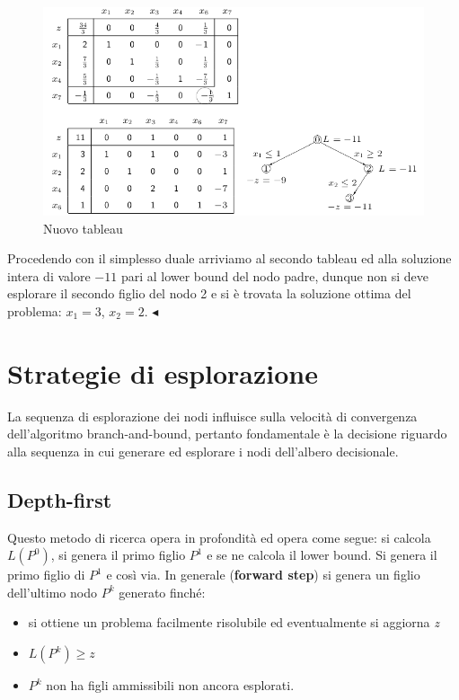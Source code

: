 \documentclass[11pt]{book}
\begin{document}
\begin{figure}[h!]
  \centering
  \includegraphics[width=\textwidth]{images/cap6tab15.png}
  \caption{Nuovo tableau}
  \label{cap6tab15}
\end{figure}

Procedendo con il simplesso duale arriviamo al secondo tableau ed alla
soluzione intera di valore $-11$ pari al lower bound del nodo padre,
dunque non si deve esplorare il secondo figlio del nodo 2 e si \`e
trovata la soluzione ottima del problema: $x_1 = 3$, $x_2 =
2$. $\blacktriangleleft$
\vspace{11pt}

\section{Strategie di esplorazione}

La sequenza di esplorazione dei nodi influisce sulla velocit\`a di
convergenza dell'algoritmo branch-and-bound, pertanto fondamentale \`e
la decisione riguardo alla sequenza in cui generare ed esplorare i
nodi dell'albero decisionale.

\subsection{Depth-first}

Questo metodo di ricerca opera in profondit\`a ed opera come segue: si
calcola $L(P^0)$, si genera il primo figlio $P^1$ e se ne calcola il
lower bound. Si genera il primo figlio di $P^1$ e cos\`i via. In
generale ({\bf forward step}) si genera un figlio dell'ultimo nodo
$P^k$ generato finch\'e:

\begin{itemize}
\item si ottiene un problema facilmente risolubile ed eventualmente
  si aggiorna {\em z}
\item $L(P^k)\geq z$
\item $P^k$ non ha figli ammissibili non ancora esplorati.
\end{itemize}
\end{document}
